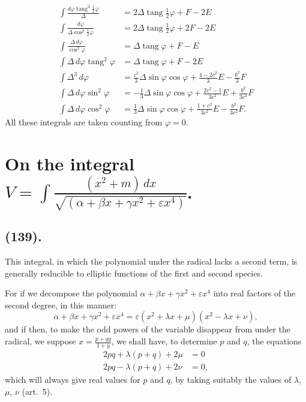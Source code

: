 \documentclass{article}
\begin{document}
\[ \begin{aligned} \int\frac{d\varphi\operatorname{tang}^{2}\frac{1}{2}\varphi}{\Delta}&=2\Delta\operatorname{tang}\tfrac{1}{2}\varphi+F-2E\\ \int\frac{d\varphi}{\Delta\cos^{2}\frac{1}{2}\varphi}&=2\Delta\operatorname{tang}\tfrac{1}{2}\varphi+2F-2E\\ \int\frac{\Delta\,d\varphi}{\cos^{2}\varphi}&=\Delta\operatorname{tang}\varphi+F-E\\ \int\Delta\,d\varphi\operatorname{tang}^{2}\varphi&=\Delta\operatorname{tang}\varphi+F-2E\\ \int\Delta^{3}\,d\varphi&=\frac{c^{2}}{3}\Delta\sin\varphi\cos\varphi+\frac{4-2c^{2}}{3}E-\frac{b^{2}}{3}F\\ \int\Delta\,d\varphi\sin^{2}\varphi&=-\tfrac{1}{3}\Delta\sin\varphi\cos\varphi+\frac{2c^{2}-1}{3c^{2}}E+\frac{b^{2}}{3c^{2}}F\\ \int\Delta\,d\varphi\cos^{2}\varphi&=\tfrac{1}{3}\Delta\sin\varphi\cos\varphi+\frac{1+c^{2}}{3c^{2}}E-\frac{b^{2}}{3c^{2}}F. \end{aligned} \]
All these integrals are taken counting from $\varphi=0$.

\section*{On the integral $V=\displaystyle\int\frac{(x^{2}+m)\,dx}{\sqrt{(\alpha+\beta x+\gamma x^{2}+\varepsilon x^{4})}}$.}

\subsection*{(139).}

This integral, in which the polynomial under the radical lacks a second term, is generally reducible to elliptic functions of the first and second species.

For if we decompose the polynomial $\alpha+\beta x+\gamma x^{2}+\varepsilon x^{4}$ into real factors of the second degree, in this manner:
\[ \alpha+\beta x+\gamma x^{2}+\varepsilon x^{4}=\varepsilon(x^{2}+\lambda x+\mu)(x^{2}-\lambda x+\nu), \]
and if then, to make the odd powers of the variable disappear from under the radical, we suppose $x=\frac{p+qy}{1+y}$, we shall have, to determine $p$ and $q$, the equations
\[ \begin{aligned} 2pq+\lambda(p+q)+2\mu&=0\\ 2pq-\lambda(p+q)+2\nu&=0, \end{aligned} \]
which will always give real values for $p$ and $q$, by taking suitably the values of $\lambda$, $\mu$, $\nu$ (art.~5).
\end{document}
